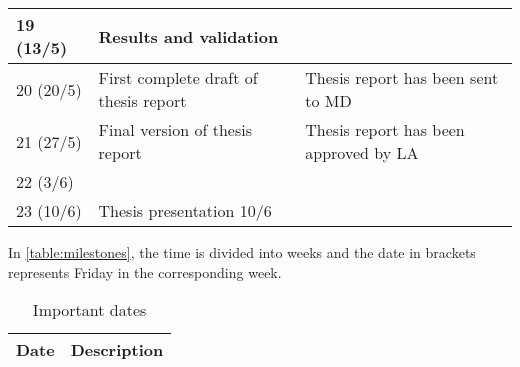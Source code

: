 \begin{table}[H]
\begin{tabular}{|p{}|p{}|p{}|}
	19 (13/5)            & Results and validation                &  \\ \hline
	20 (20/5)            & First complete draft of thesis report & Thesis report has been sent to MD                                 \\ \hline
	21 (27/5)            & Final version of thesis report        & Thesis report has been approved by LA                             \\ \hline
	22 (3/6)             &                                       &  \\ \hline
	23 (10/6)            & Thesis presentation 10/6              &  \\ \hline
\end{tabular}
\end{table}

In \cref{table:milestones}, the time is divided into weeks and the date in brackets represents Friday in the corresponding week. 


\begin{table}[H]
	\caption{Important dates}
	\label{table:dates}
	\begin{tabular}{|p{}|p{}|}
		\hline
		Date & Description \\ \hline
	\end{tabular}
\end{table}


